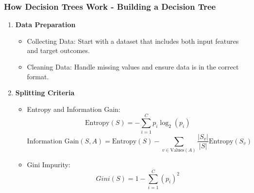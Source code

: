 \documentclass[aspectratio=169]{beamer}
\begin{document}
\begin{frame}[fragile]
    \frametitle{How Decision Trees Work - Building a Decision Tree}
    \begin{enumerate}
        \item \textbf{Data Preparation}
        \begin{itemize}
            \item Collecting Data: Start with a dataset that includes both input features and target outcomes.
            \item Cleaning Data: Handle missing values and ensure data is in the correct format.
        \end{itemize}

        \item \textbf{Splitting Criteria}
        \begin{itemize}
            \item Entropy and Information Gain:
            \begin{equation*}
                \text{Entropy}(S) = - \sum_{i=1}^{C} p_i \log_2(p_i)
            \end{equation*}
            \begin{equation*}
                \text{Information Gain}(S, A) = \text{Entropy}(S) - \sum_{v \in \text{Values}(A)} \frac{|S_v|}{|S|} \text{Entropy}(S_v)
            \end{equation*}
            \item Gini Impurity:
            \begin{equation*}
                Gini(S) = 1 - \sum_{i=1}^{C} (p_i)^2
            \end{equation*}
        \end{itemize}
    \end{enumerate}
\end{frame}
\end{document}
